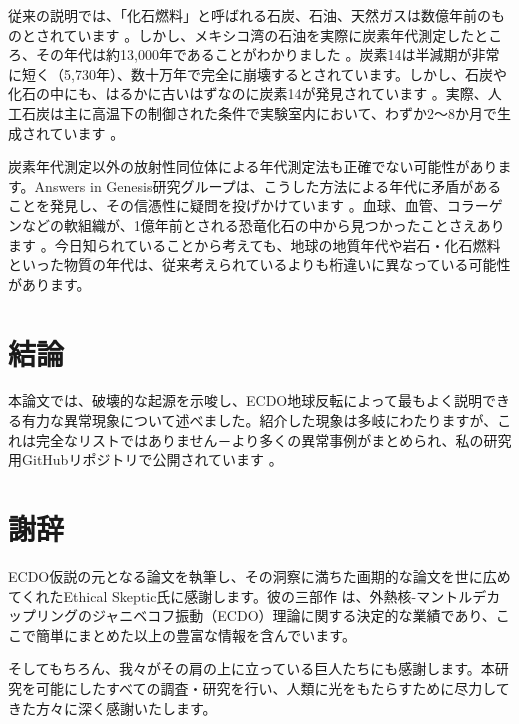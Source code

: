 \documentclass[10pt,twocolumn,letterpaper]{article}
\begin{document}
従来の説明では、「化石燃料」と呼ばれる石炭、石油、天然ガスは数億年前のものとされています \cite{104}。しかし、メキシコ湾の石油を実際に炭素年代測定したところ、その年代は約13,000年であることがわかりました \cite{105}。炭素14は半減期が非常に短く（5,730年）、数十万年で完全に崩壊するとされています。しかし、石炭や化石の中にも、はるかに古いはずなのに炭素14が発見されています \cite{106}。実際、人工石炭は主に高温下の制御された条件で実験室内において、わずか2～8か月で生成されています \cite{107}。

炭素年代測定以外の放射性同位体による年代測定法も正確でない可能性があります。Answers in Genesis研究グループは、こうした方法による年代に矛盾があることを発見し、その信憑性に疑問を投げかけています \cite{108}。血球、血管、コラーゲンなどの軟組織が、1億年前とされる恐竜化石の中から見つかったことさえあります \cite{109,110}。今日知られていることから考えても、地球の地質年代や岩石・化石燃料といった物質の年代は、従来考えられているよりも桁違いに異なっている可能性があります。

\section{結論}

本論文では、破壊的な起源を示唆し、ECDO地球反転によって最もよく説明できる有力な異常現象について述べました。紹介した現象は多岐にわたりますが、これは完全なリストではありません－より多くの異常事例がまとめられ、私の研究用GitHubリポジトリで公開されています \cite{2}。

\section{謝辞}

ECDO仮説の元となる論文を執筆し、その洞察に満ちた画期的な論文を世に広めてくれたEthical Skeptic氏に感謝します。彼の三部作 \cite{1} は、外熱核-マントルデカップリングのジャニベコフ振動（ECDO）理論に関する決定的な業績であり、ここで簡単にまとめた以上の豊富な情報を含んでいます。

そしてもちろん、我々がその肩の上に立っている巨人たちにも感謝します。本研究を可能にしたすべての調査・研究を行い、人類に光をもたらすために尽力してきた方々に深く感謝いたします。

\clearpage
\twocolumn

{\small
\renewcommand{\refname}{References}


}
\end{document}
